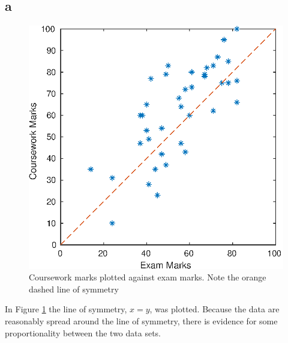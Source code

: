 \subsection{a}
\begin{figure}[h]
	\includegraphics[scale=0.6, center]{./eps/topic1_a.eps}
    \caption{Coursework marks plotted against exam marks. Note the orange dashed line of symmetry}
    \label{fig:Topic1-a}
\end{figure}
In Figure \ref{fig:Topic1-a} the line of symmetry, $x=y$, was plotted.
Because the data are reasonably spread around the line of symmetry, there is evidence for some proportionality between the two data sets.


\pagebreak

